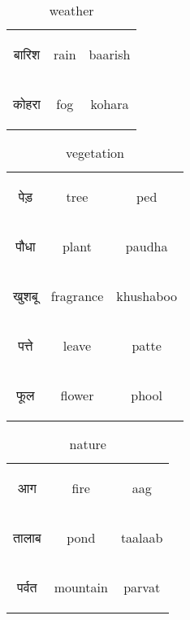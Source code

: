 \begin{table}[H]
    \centering 
    \begin{tabular}{c|c|c}
            \begin{hindi} बारिश  \end{hindi} & rain & baarish \\
            \begin{hindi} कोहरा  \end{hindi} & fog & kohara \\
    \end{tabular}
    \caption{weather}
    \label{tab:nouns_weather}
\end{table}


\begin{table}[H]
    \centering 
    \begin{tabular}{c|c|c}
            \begin{hindi} पेड़  \end{hindi} & tree & ped \\
            \begin{hindi} पौधा  \end{hindi} & plant & paudha \\
            \begin{hindi} खुशबू  \end{hindi} & fragrance & khushaboo \\
            \begin{hindi} पत्ते  \end{hindi} & leave & patte \\
            \begin{hindi} फूल  \end{hindi} & flower & phool \\
    \end{tabular}
    \caption{vegetation}
    \label{tab:nouns_vegetation}
\end{table}

\begin{table}[H]
    \centering 
    \begin{tabular}{c|c|c}
            \begin{hindi} आग  \end{hindi} & fire & aag \\
            \begin{hindi} तालाब  \end{hindi} & pond & taalaab \\
            \begin{hindi} पर्वत  \end{hindi} & mountain & parvat \\
    \end{tabular}
    \caption{nature}
    \label{tab:nouns_nature}
\end{table}


